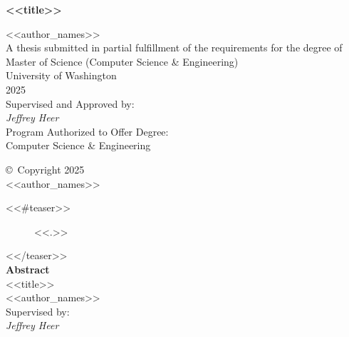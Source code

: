 \documentclass[<<class_options>>]{template-thesis}
\numberwithin{figure}{section}
\numberwithin{table}{section}
\begin{document}
\setcounter{secnumdepth}{-1} %

\begin{titlepage}
  \thispagestyle{empty} %
  \begin{center}
    \vspace*{3cm}
    {\Large\bfseries <<title>> \par}
    \vspace{1.25cm}
    <<author_names>> \\[2em]
    A thesis submitted in partial fulfillment of the requirements for the degree of \\[1em]
    Master of Science (Computer Science \& Engineering) \\
    University of Washington \\
    2025 \\[2em]
    Supervised and Approved by: \\
    \textit{Jeffrey Heer} \\[2em]
    
    Program Authorized to Offer Degree:\\
    Computer Science \& Engineering
  \end{center}
\end{titlepage}

\begin{titlepage}
  \thispagestyle{empty} %
  \begin{center}
    \vspace*{7cm}
    \copyright\ Copyright 2025 \\
    <<author_names>>
  \end{center}
\end{titlepage}

\clearpage
\vspace*{\fill}
\begin{center}
  <<#teaser>>
  \begin{figure}
  <<.>>
  \end{figure}
  <</teaser>> \\[2em]
  {\bfseries Abstract} \\[2em]
  {\large <<title>>} \\[1em]
  <<author_names>> \\[1em]
  Supervised by:\\
  \textit{Jeffrey Heer} \\[2em]
\end{center}
\thispagestyle{plain} %
\end{document}
